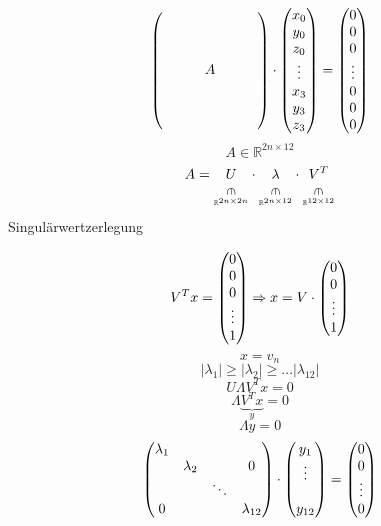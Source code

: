 \[ 
\vektor{%
	 & & &     & & & \\
	 & & &     & & & \\
	 & & &     & & & \\
	 & & &  A  & & & \\
	 & & &     & & & \\
	 & & &     & & & \\
	 & & &     & & & 
	 } \cdot \vektor{x_0\\y_0\\z_0\\\vdots\\x_3\\y_3\\z_3} = \vektor{0\\0\\0\\ \vdots\\0\\0\\0}
 \]
 \[ A \in \mathbb{R}^{2n\times12} \]
 \[ A = \underset{\underset{\mathbb{R}^{2n\times2n}}{\rotatebox{-90}{$\in$}}}{U} \cdot \underset{\underset{\mathbb{R}^{2n\times12}}{\rotatebox{-90}{$\in$}}}{\lambda} \cdot \underset{\underset{\mathbb{R}^{12\times 12}}{\rotatebox{-90}{$\in$}}}{V^T} \]
 Singulärwertzerlegung
 
 \[ V^Tx = \begin{pmatrix}0\\0\\0\\\vdots\\1\end{pmatrix} \Rightarrow x = V\cdot\begin{pmatrix}0\\0\\\vdots\\1\end{pmatrix} \]
 \[ x = v_n \]
 \[ |\lambda_1| \geq |\lambda_2| \geq \ldots |\lambda_{12}| \]
 \[ U \Lambda V^T x = 0 \]
 \[ \Lambda \underset{y}{\underbrace{V^T x}} = 0 \]
 \[ \Lambda y = 0 \]
 \[ \begin{pmatrix}
 \lambda_1& & & \\
  &\lambda_2 & &0 \\
  & &\ddots & \\
  0& & &\lambda_{12} \\
 \end{pmatrix} \cdot \begin{pmatrix}y_1\\\vdots\\ \\ y_{12}\end{pmatrix} = \begin{pmatrix}0\\0\\\vdots\\0\end{pmatrix} \]